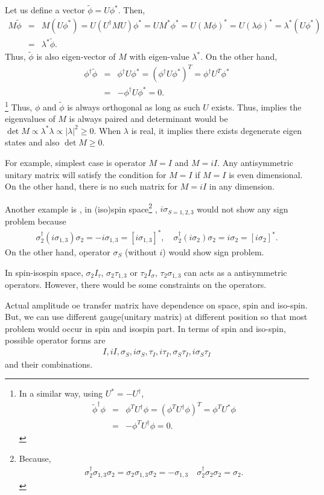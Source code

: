 \documentclass[10pt]{book}
\newcommand{\bea}{\begin{eqnarray}}
\newcommand{\eea}{\end{eqnarray}}
\newcommand{\no}{\nonumber \\}
\begin{document}
Let us define a vector $\tilde{\phi}=U\phi^*$. Then, 
\bea 
M\tilde{\phi}&=&M(U\phi^*)=U(U^\dagger M U)\phi^*= U M^*\phi^*=U(M\phi)^*=U(\lambda\phi)^*
             =\lambda^* (U\phi^*) \no 
             &=&\lambda^*\tilde{\phi}. 
\eea 
Thus, $\tilde{\phi}$ is also eigen-vector of $M$ with eigen-value $\lambda^*$. 
On the other hand,
\bea 
\phi^\dagger\tilde{\phi}&=&\phi^\dagger U \phi^* =(\phi^\dagger U \phi^*)^T
           =\phi^\dagger U^T \phi^* \no 
           &=& -\phi^\dagger U \phi^*=0.
\eea 
\footnote{ 
In a similar way, using $U^*=-U^\dagger$,
\bea 
\tilde{\phi}^\dagger\phi&=&\phi^T U^\dagger \phi = (\phi^T U^\dagger \phi)^T
                       =\phi^T U^* \phi \no 
                       &=& -\phi^T U^\dagger \phi=0.
\eea  
}   
Thus, $\phi$ and $\tilde{\phi}$ is always orthogonal as long as such $U$ exists.
Thus, implies the eigenvalues of $M$ is always paired and
determinant would be $\det M\propto \lambda^* \lambda \propto |\lambda|^2\geq 0$.
When $\lambda$ is real, it implies there exists degenerate eigen states
and also $\det M\geq 0$.

For example, simplest case is operator $M=I$ and $M=i I$. 
Any antisymmetric unitary matrix will satisfy the condition for $M=I$
if $M=I$ is even dimensional. On the other hand, there is no such matrix
for $M=i I$ in any dimension. 

Another example is , in (iso)spin space\footnote{Because,
\bea 
\sigma_2^\dagger \sigma_{1,3} \sigma_2=\sigma_2 \sigma_{1,3} \sigma_2 =-\sigma_{1,3}\quad 
\sigma_2^\dagger\sigma_2\sigma_2=\sigma_2.                                     
\eea 
} , $i\sigma_{S=1,2,3}$ would not show any sign problem because 
\bea 
\sigma_2^\dagger(i\sigma_{1,3})\sigma_2=-i\sigma_{1,3}=[i\sigma_{1,3}]^*,\quad 
\sigma_2^\dagger (i\sigma_2) \sigma_2 = i\sigma_2 =[i\sigma_2]^* .
\eea 
On the other hand, operator $\sigma_S$ (without $i$) would show sign problem. 

In spin-isospin space, 
$\sigma_2 I_\tau $, $\sigma_2\tau_{1,3}$ or $\tau_2 I_\sigma$, $\tau_2\sigma_{1,3}$
can acts as a antisymmetric operators. However, there would be some constraints on the 
operators. 

Actual amplitude oe transfer matrix have dependence on space, spin and iso-spin.
But, we can use different gauge(unitary matrix) at different position so that
most problem would occur in spin and isospin part. In terms of spin and iso-spin,
possible operator forms are
\bea 
I, iI, \sigma_S, i\sigma_S, \tau_I, i\tau_I, \sigma_S\tau_I, i\sigma_S\tau_I
\eea 
and their combinations. 
\end{document}
